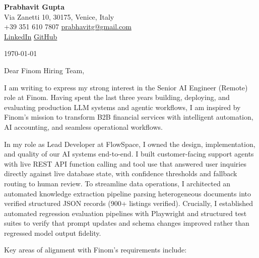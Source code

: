 \documentclass[11pt,a4paper]{article}
\begin{document}
\begin{center}
    {\huge \textbf{Prabhavit Gupta}} \\
    \vspace{4pt}
    Via Zanetti 10, 30175, Venice, Italy \\
    +39 351 610 7807 \textbar{} \href{mailto:prabhavitg@gmail.com}{prabhavitg@gmail.com} \\
    \href{https://www.linkedin.com/in/prabhavit/}{LinkedIn} \textbar{} \href{https://github.com/prab-gupta}{GitHub}
\end{center}

\vspace{14pt}

\noindent \today

\vspace{6pt}

\noindent Dear Finom Hiring Team,

\vspace{6pt}

\noindent I am writing to express my strong interest in the Senior AI Engineer (Remote) role at Finom. Having spent the last three years building, deploying, and evaluating production LLM systems and agentic workflows, I am inspired by Finom's mission to transform B2B financial services with intelligent automation, AI accounting, and seamless operational workflows.

\noindent In my role as Lead Developer at FlowSpace, I owned the design, implementation, and quality of our AI systems end-to-end. I built customer-facing support agents with live REST API function calling and tool use that answered user inquiries directly against live database state, with confidence thresholds and fallback routing to human review. To streamline data operations, I architected an automated knowledge extraction pipeline parsing heterogeneous documents into verified structured JSON records (900+ listings verified). Crucially, I established automated regression evaluation pipelines with Playwright and structured test suites to verify that prompt updates and schema changes improved rather than regressed model output fidelity.

\noindent Key areas of alignment with Finom's requirements include:
\end{document}
